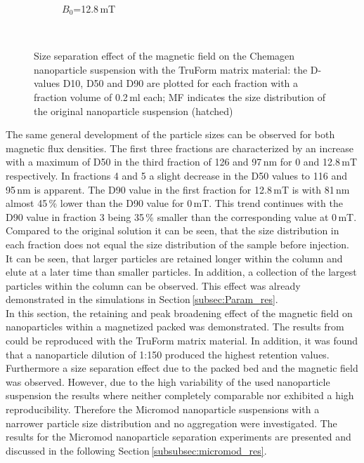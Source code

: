 \begin{figure}[H]
\begin{subfigure}{0.49\textwidth}
                \caption{$B_{0}$=12.8\,mT}\label{subfig:chemagen_size_128mT}
        \end{subfigure}
        \\        
        \caption[Size separation effect of the magnetic field on the Chemagen nanoparticle suspension with the TruForm matrix material]{Size separation effect of the magnetic field on the Chemagen nanoparticle suspension with the TruForm matrix material: the D-values D10, D50 and D90 are plotted for each fraction with a fraction volume of 0.2\,ml each; MF indicates the size distribution of the original nanoparticle suspension (hatched)}
        \label{fig:chemagen_size_separation}
  \end{figure}

The same general development of the particle sizes can be observed for both magnetic flux densities. The first three fractions are characterized by an increase with a maximum of D50 in the third fraction of 126 and 97\,nm for 0 and 12.8\,mT respectively. In fractions 4 and 5 a slight decrease in the D50 values to 116 and 95\,nm is apparent. The D90 value in the first fraction for 12.8\,mT is with 81\,nm almost 45\,\% lower than the D90 value for 0\,mT. This trend continues with the D90 value in fraction 3 being 35\,\% smaller than the corresponding value at 0\,mT. Compared to the original solution it can be seen, that the size distribution in each fraction does not equal the size distribution of the sample before injection. It can be seen, that larger particles are retained longer within the column and elute at a later time than smaller particles. In addition, a collection of the largest particles within the column can be observed.  This effect was already demonstrated in the simulations in Section\,\ref{subsec:Param_res}. \\    
  
In this section, the retaining and peak broadening effect of the magnetic field on nanoparticles within a magnetized packed was demonstrated. The results from \cite{AndreMaster} could be reproduced with the TruForm matrix material. In addition, it was found that a nanoparticle dilution of 1:150 produced the highest retention values. Furthermore a size separation effect due to the packed bed and the magnetic field was observed. However, due to the high variability of the used nanoparticle suspension the results where neither completely comparable nor exhibited a high reproducibility. Therefore the Micromod nanoparticle suspensions with a narrower particle size distribution and no aggregation were investigated. The results for the Micromod nanoparticle separation experiments are presented and discussed in the following Section\,\ref{subsubsec:micromod_res}.\newpage 

